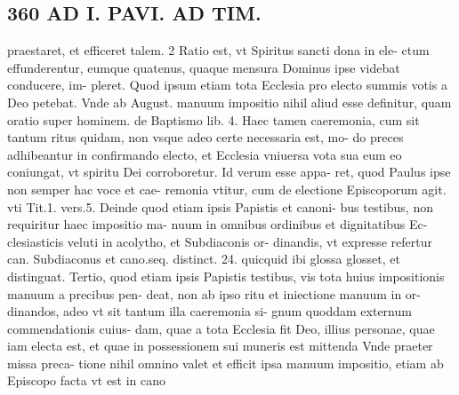 \documentclass{article}
\begin{document}
\begin{pages}
\section*{360 AD I. PAVI. AD TIM. }\pstart praestaret, et efficeret talem. 2 Ratio est, vt Spiritus sancti dona in ele- ctum effunderentur, eumque quatenus, quaque mensura Dominus ipse videbat conducere, im- pleret. Quod ipsum etiam tota Ecclesia pro electo summis votis a Deo petebat. Vnde ab August. manuum impositio nihil aliud esse definitur, quam oratio super hominem. de Baptismo lib. 4. Haec tamen caeremonia, cum sit tantum ritus quidam, non vsque adeo certe necessaria est, mo- do preces adhibeantur in confirmando electo, et Ecclesia vniuersa vota sua eum eo coniungat, vt spiritu Dei corroboretur. Id verum esse appa- ret, quod Paulus ipse non semper hac voce et cae- remonia vtitur, cum de electione Episcoporum agit. vti Tit.1. vers.5. Deinde quod etiam ipsis Papistis et canoni- bus testibus, non requiritur haec impositio ma- nuum in omnibus ordinibus et dignitatibus Ec- clesiasticis veluti in acolytho, et Subdiaconis or- dinandis, vt expresse refertur can. Subdiaconus et cano.seq. distinct. 24. quicquid ibi glossa glosset, et distinguat. Tertio, quod etiam ipsis Papistis testibus, vis tota huius impositionis manuum a precibus pen- deat, non ab ipso ritu et iniectione manuum in or- dinandos, adeo vt sit tantum illa caeremonia si- gnum quoddam externum commendationis cuius- dam, quae a tota Ecclesia fit Deo, illius personae, quae iam electa est, et quae in possessionem sui muneris est mittenda Vnde praeter missa preca- tione nihil omnino valet et efficit ipsa manuum impositio, etiam ab Episcopo facta vt est in cano  \pend

\end{pages}
\end{document}
